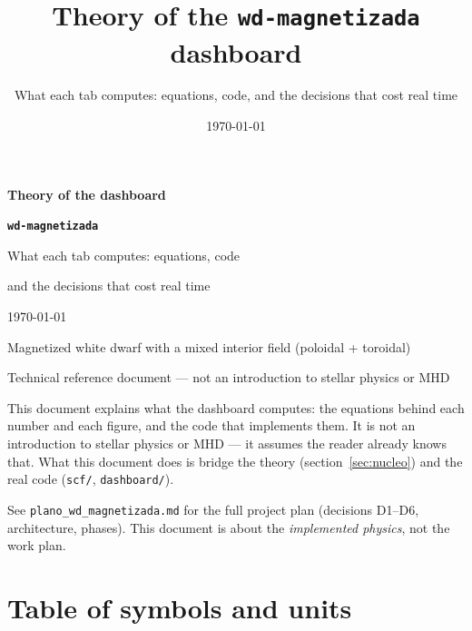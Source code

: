 \documentclass[11pt,a4paper]{scrartcl}
\title{\Huge Theory of the \texttt{wd-magnetizada} dashboard}
\subtitle{What each tab computes: equations, code, and the decisions that cost real time}
\author{}
\date{\today}
\newcommand{\code}[1]{\texttt{\small #1}}
\begin{document}
\begin{titlepage}
\centering
\vspace*{4cm}
{\Huge\bfseries Theory of the dashboard\par}
\vspace{0.3cm}
{\Huge\bfseries \texttt{wd-magnetizada}\par}
\vspace{1.2cm}
{\Large What each tab computes: equations, code\par and the decisions that cost real time\par}
\vspace{2.5cm}
{\large \today\par}
\vfill
{\small Magnetized white dwarf with a mixed interior field (poloidal + toroidal)\par
Technical reference document --- not an introduction to stellar physics or MHD\par}
\vspace{1cm}
\end{titlepage}

\tableofcontents
\newpage

This document explains what the dashboard computes: the equations behind
each number and each figure, and the code that implements them. It is not
an introduction to stellar physics or MHD --- it assumes the reader
already knows that. What this document does is bridge the theory
(section~\ref{sec:nucleo}) and the real code (\code{scf/}, \code{dashboard/}).

See \code{plano\_wd\_magnetizada.md} for the full project plan
(decisions D1--D6, architecture, phases). This document is about the
\emph{implemented physics}, not the work plan.

\section*{Table of symbols and units}
\end{document}
